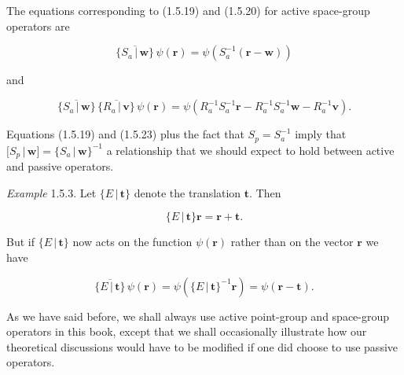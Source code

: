 \documentclass[11pt,a4paper,twoside,openright]{book}
\begin{document}
The equations corresponding to (1.5.19) and (1.5.20) for active space-group operators are

\begin{equation*}
\overline{\{S_{a} \,|\, \mathbf{w}\}}\,\psi(\mathbf{r}) = \psi(S_{a}^{-1}(\mathbf{r} - \mathbf{w})) \tag{1.5.23}
\end{equation*}

and

\begin{equation*}
\overline{\{S_{a} \,|\, \mathbf{w}\}}\,\overline{\{R_{a} \,|\, \mathbf{v}\}}\,\psi(\mathbf{r}) = \psi(R_{a}^{-1}S_{a}^{-1}\mathbf{r} - R_{a}^{-1}S_{a}^{-1}\mathbf{w} - R_{a}^{-1}\mathbf{v}). \tag{1.5.24}
\end{equation*}

Equations (1.5.19) and (1.5.23) plus the fact that $S_{p} = S_{a}^{-1}$ imply that $[S_{p} \,|\, \mathbf{w}] = \{S_{a} \,|\, \mathbf{w}\}^{-1}$ a relationship that we should expect to hold between active and passive operators.

\textit{Example} 1.5.3. Let $\{E \,|\, \mathbf{t}\}$ denote the translation $\mathbf{t}$. Then

\begin{equation*}
\{E \,|\, \mathbf{t}\}\mathbf{r} = \mathbf{r} + \mathbf{t}. \tag{1.5.25}
\end{equation*}

But if $\{E \,|\, \mathbf{t}\}$ now acts on the function $\psi(\mathbf{r})$ rather than on the vector $\mathbf{r}$ we have

\begin{equation*}
\overline{\{E \,|\, \mathbf{t}\}}\,\psi(\mathbf{r}) = \psi(\{E \,|\, \mathbf{t}\}^{-1}\mathbf{r}) = \psi(\mathbf{r} - \mathbf{t}). \tag{1.5.26}
\end{equation*}

As we have said before, we shall always use active point-group and space-group operators in this book, except that we shall occasionally illustrate how our theoretical discussions would have to be modified if one did choose to use passive operators.
\end{document}
